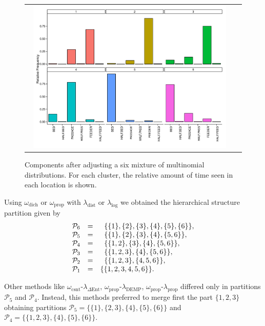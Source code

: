 \documentclass[submit]{smj}
\theoremstyle{definition}
\begin{document}
\begin{figure}[!t]
\begin{center}
\begin{tabular}{cc}
  \includegraphics[width=0.95\textwidth]{figures/multinomial_mixt_all.pdf} \\
 \end{tabular}
 \caption{Components after adjusting a six mixture of multinomial distributions. For each cluster, the relative amount of time seen in each location is shown.}\label{multinomial_mixture}
\end{center}
\end{figure}

Using $\omega_{\text{dich}}$ or  $\omega_{\text{prop}}$ with $\lambda_{\text{dist}}$ or $\lambda_{\log}$ we obtained the hierarchical structure partition given by
\begin{equation}
\begin{array}{r c l}
 \mathcal{P}_6&=& \;\; \{\{1\},\{2\},\{3\},\{4\},\{5\},\{6\}\}, \\
 \mathcal{P}_5&=& \;\; \{\{1\},\{2\},\{3\},\{4\},\{5,6\}\}, \\ 
 \mathcal{P}_4&=& \;\; \{\{1,2\},\{3\},\{4\},\{5,6\}\}, \\ 
 \mathcal{P}_3&=& \;\; \{\{1,2,3\},\{4\},\{5,6\}\}, \\ 
 \mathcal{P}_2&=& \;\; \{\{1,2,3\},\{4,5,6\}\}, \\ 
 \mathcal{P}_1&=& \{\{1,2,3,4,5,6\}\}.
\end{array}
\label{hier_ex_multinomial}
\end{equation}

Other methods like $\omega_{\text{csnt}}$-$\lambda_{\Delta\text{Ent}}$,  $\omega_{\text{prop}}$-$\lambda_{\text{DEMP}}$,  $\omega_{\text{prop}}$-$\lambda_{\text{prop}}$ differed only in partitions $\mathcal{P}_5$ and $\mathcal{P}_4$.  Instead, this methods preferred to merge first the part $\{1,2,3\}$ obtaining partitions $\mathcal{P}_5 = \{\{1\},\{2, 3\},\{4\},\{5\} ,\{6\}\}$ and $\mathcal{P}_4 = \{\{1,2,3\},\{4\},\{5\},\{6\}\}$.
\end{document}
